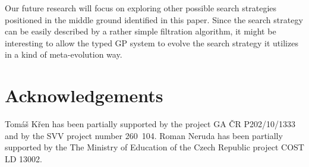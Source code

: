 \documentclass[conference]{IEEEtran}
\begin{document}
Our future research will focus on exploring other possible search strategies positioned in the middle ground 
identified in this paper. Since the search strategy can be easily described by a rather simple filtration algorithm, it might be
interesting to allow the typed GP system to evolve the search strategy it 
utilizes in a kind of meta-evolution way. 

\section*{Acknowledgements}
Tom\'{a}\v{s} K\v{r}en has been partially supported by the project GA \v{C}R P202/10/1333 and by the SVV project number 260~104. Roman Neruda has been partially supported by the The Ministry of Education of the Czech Republic project COST LD 13002.








\end{document}
